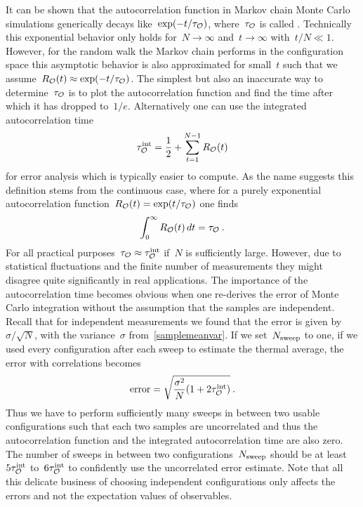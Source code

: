 It can be shown that the autocorrelation function in Markov chain Monte Carlo
simulations generically decays like~$\exp(-t/\tau_{\mathcal{O}})$, where~$\tau_{\mathcal{O}}$ is
called . Technically this exponential behavior
only holds for~$N \to \infty$ and~$t \to \infty$ with~$t/N \ll 1$. However, for
the random walk the Markov chain performs in the configuration space this
asymptotic behavior is also approximated for small~$t$ such that we
assume~$R_{\mathcal{O}}(t) \approx \exp(-t/\tau_{\mathcal{O}})$. The simplest but also an
inaccurate way to determine~$\tau_{\mathcal{O}}$ is to plot the autocorrelation function
and find the time after which it has dropped to~$1/e$. Alternatively one can
use the integrated autocorrelation time
%
\begin{equation}\label{tauint}
  \tau^{\mathrm{int}}_{\mathcal{O}} = \frac{1}{2} + \sum_{t=1}^{N-1} R_{\mathcal{O}}(t)
\end{equation}
%
for error analysis which is typically easier to compute. As the name suggests
this definition stems from the continuous case, where for a purely exponential
autocorrelation function~$R_{\mathcal{O}}(t) = \exp(t/\tau_{\mathcal{O}})$ one finds
%
\begin{equation}
  \int_0^{\infty} R_{\mathcal{O}}(t) \,dt = \tau_{\mathcal{O}}\:.
\end{equation}
%
For all practical purposes~$\tau_{\mathcal{O}} \approx \tau^{\mathrm{int}}_{\mathcal{O}}$ if~$N$ is
sufficiently large. However, due to statistical fluctuations and the finite
number of measurements they might disagree quite significantly in real
applications. The importance of the autocorrelation time becomes obvious when
one re-derives the error of Monte Carlo integration without the assumption that
the samples are independent. Recall that for independent measurements we found
that the error is given by~$\sigma/\sqrt{N}$, with the variance~$\sigma$
from~\eqref{samplemeanvar}. If we set~$N_{\mathrm{sweep}}$ to one, \ie{} if we used every
configuration after each sweep to estimate the thermal average, the error with
correlations becomes
%
\begin{equation}\label{correrror}
  \text{error} = \sqrt{\frac{\sigma^2}{N}(1 + 2\tau^{\mathrm{int}}_{\mathcal{O}})}\:.
\end{equation}
%
Thus we have to perform sufficiently many sweeps in between two usable
configurations such that each two samples are uncorrelated and thus the
autocorrelation function and the integrated autocorrelation time are also zero.
The number of sweeps in between two configurations~$N_{\mathrm{sweep}}$ should be at
least~$5 \tau^{\mathrm{int}}_{\mathcal{O}}$ to~$6 \tau^{\mathrm{int}}_{\mathcal{O}}$ to confidently use the uncorrelated
error estimate. Note that all this delicate business of choosing independent
configurations only affects the errors and not the expectation values of
observables.

